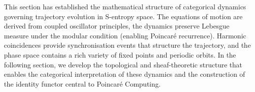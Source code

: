 This section has established the mathematical structure of categorical dynamics governing trajectory evolution in S-entropy space. The equations of motion are derived from coupled oscillator principles, the dynamics preserve Lebesgue measure under the modular condition (enabling Poincaré recurrence). Harmonic coincidences provide synchronisation events that structure the trajectory, and the phase space contains a rich variety of fixed points and periodic orbits. In the following section, we develop the topological and sheaf-theoretic structure that enables the categorical interpretation of these dynamics and the construction of the identity functor central to Poincaré Computing.
